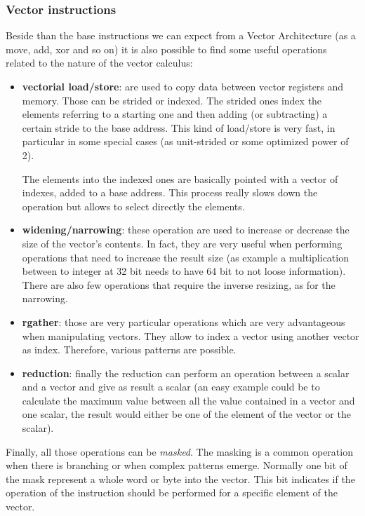 \subsubsection{Vector instructions}
Beside than the base instructions we can expect from a Vector Architecture (as a move, add, xor and so on) it is also possible to find some useful operations related to the nature of the vector calculus\cite{riscv-v-specs}:
\begin{itemize}
    \item \textbf{vectorial load/store}: are used to copy data between vector registers and memory. Those can be strided or indexed. The strided ones index the elements referring to a starting one and then adding (or subtracting) a certain stride to the base address. This kind of load/store is very fast, in particular in some special cases (as unit-strided or some optimized power of 2).
    
    The elements into the indexed ones are basically pointed with a vector of indexes, added to a base address. This process really slows down the operation but allows to select directly the elements.
    
    \item \textbf{widening/narrowing}: these operation are used to increase or decrease the size of the vector's contents. In fact, they are very useful when performing operations that need to increase the result size (as example a multiplication between to integer at 32 bit needs to have 64 bit to not loose information). There are also few operations that require the inverse resizing, as for the narrowing.
    
    \item \textbf{rgather}: those are very particular operations which are very advantageous when manipulating vectors. They allow to index a vector using another vector as index. Therefore, various patterns are possible.
    
    \item \textbf{reduction}: finally the reduction can perform an operation between a scalar and a vector and give as result a scalar (an easy example could be to calculate the maximum value between all the value contained in a vector and one scalar, the result would either be one of the element of the vector or the scalar).
    
\end{itemize}


Finally, all those operations can be \textit{masked}. The masking is a common operation when there is branching or when complex patterns emerge.
Normally one bit of the mask represent a whole word or byte into the vector. This bit indicates if the operation of the instruction should be performed for a specific element of the vector.

